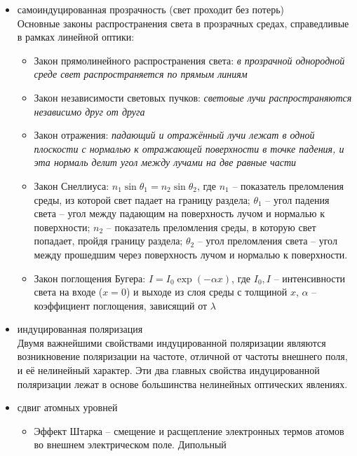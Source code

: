 
\begin{itemize}
	\item самоиндуцированная прозрачность (свет проходит без потерь) \\
		Основные законы распространения света в прозрачных средах, 
		справедливые в рамках линейной оптики:
		\begin{itemize}
			\item Закон прямолинейного распространения света: 
				\emph{в прозрачной однородной среде свет распространяется 
					по прямым линиям}
			\item Закон независимости световых пучков: 
				\emph{световые лучи распространяются независимо друг от друга}
			\item Закон отражения: 
				\emph{падающий и отражённый лучи лежат в одной плоскости с 
				нормалью к отражающей поверхности в точке падения, и эта 
				нормаль делит угол между лучами на две равные части}
			\item Закон Снеллиуса: \( n_1 \sin\theta_1 = n_2 \sin\theta_2 \), 
				где \( n_1 \) -- показатель преломления среды, из которой свет 
				падает на границу раздела; \( \theta_1 \) -- угол падения 
				света -- угол между падающим на поверхность лучом и нормалью 
				к поверхности; \( n_2 \) -- показатель преломления среды, в 
				которую свет попадает, пройдя границу раздела; 
				\( \theta_2 \) -- угол преломления света -- угол между 
				прошедшим через поверхность лучом и нормалью к поверхности. 
			\item Закон поглощения Бугера: \( I = I_0\exp(-\alpha x) \), 
				где \( I_0, I \) -- интенсивности света на входе 
				(\( x = 0 \)) и выходе из слоя среды с толщиной \( x \), 
				\( \alpha \) -- коэффициент поглощения, зависящий от 
				\( \lambda \)
		\end{itemize} 
	\item индуцированная поляризация \\
		Двумя важнейшими свойствами индуцированной поляризации являются 
		возникновение поляризации на частоте, отличной от частоты внешнего 
		поля, и её нелинейный характер. Эти два главных свойства 
		индуцированной поляризации лежат в основе большинства нелинейных 
		оптических явлениях.
	\item сдвиг атомных уровней
		\begin{itemize}
			\item Эффект Штарка -- смещение и расщепление электронных 
				термов атомов во внешнем электрическом поле. Дипольный 

\end{itemize}
\end{itemize}
